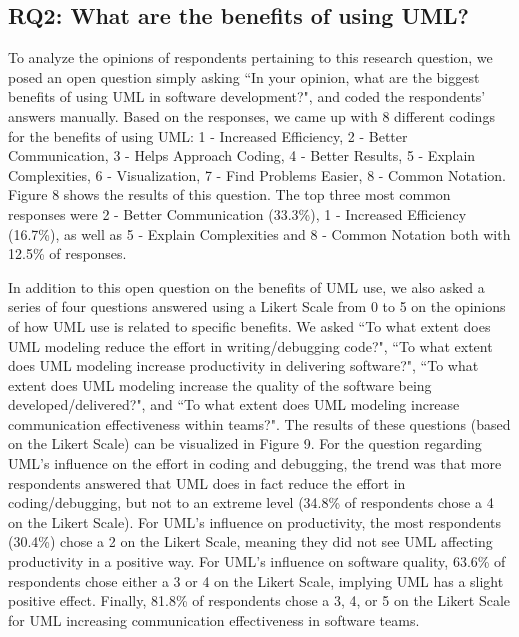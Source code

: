 \documentclass[letterpaper, 10 pt, conference]{ieeeconf}  %
\begin{document}
\subsection{RQ2: What are the benefits of using UML?}

To analyze the opinions of respondents pertaining to this research question, we posed an open question simply asking ``In your opinion, what are the biggest benefits of using UML in software development?", and coded the respondents' answers manually. Based on the responses, we came up with 8 different codings for the benefits of using UML: 1 - Increased Efficiency, 2 - Better Communication, 3 - Helps Approach Coding, 4 - Better Results, 5 - Explain Complexities, 6 - Visualization, 7 - Find Problems Easier, 8 - Common Notation. Figure 8 shows the results of this question. The top three most common responses were 2 - Better Communication (33.3\%), 1 - Increased Efficiency (16.7\%), as well as 5 - Explain Complexities and 8 - Common Notation both with 12.5\% of responses.

In addition to this open question on the benefits of UML use, we also asked a series of four questions answered using a Likert Scale from 0 to 5 on the opinions of how UML use is related to specific benefits. We asked ``To what extent does UML modeling reduce the effort in writing/debugging code?", ``To what extent does UML modeling increase productivity in delivering software?", ``To what extent does UML modeling increase the quality of the software being developed/delivered?", and ``To what extent does UML modeling increase communication effectiveness within teams?". The results of these questions (based on the Likert Scale) can be visualized in Figure 9. For the question regarding UML's influence on the effort in coding and debugging, the trend was that more respondents answered that UML does in fact reduce the effort in coding/debugging, but not to an extreme level (34.8\% of respondents chose a 4 on the Likert Scale). For UML's influence on productivity, the most respondents (30.4\%) chose a 2 on the Likert Scale, meaning they did not see UML affecting productivity in a positive way. For UML's influence on software quality, 63.6\% of respondents chose either a 3 or 4 on the Likert Scale, implying UML has a slight positive effect. Finally, 81.8\% of respondents chose a 3, 4, or 5 on the Likert Scale for UML increasing communication effectiveness in software teams.

	\begin{figure}[!htb]
      \centering
      \label{RQ2Concl}
   \end{figure}
   
\end{document}
